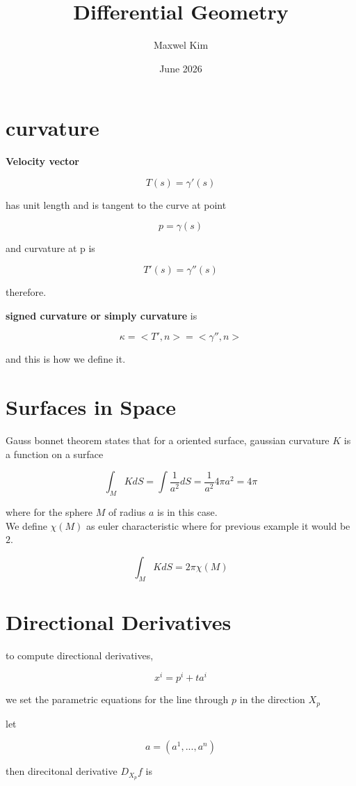 \documentclass{article}
\title{Differential Geometry}
\author{Maxwel Kim}
\date{June 2026}
\begin{document}
\maketitle

\section*{curvature}

\textbf{Velocity vector} 

\[
T(s)=\gamma'(s)
\]

has unit length and is tangent to the curve at point

\[
p=\gamma(s)
\]

and curvature at p is

\[
T'(s)=\gamma''(s)
\]

therefore.

\textbf{signed curvature or simply curvature} is 

\[
\kappa =<T',n>=<\gamma'',n>
\]

and this is how we define it.

\section*{Surfaces in Space}

Gauss bonnet theorem states that for a oriented surface, gaussian curvature $K$ is a function on a surface

\[
\int_M KdS=\int \frac{1}{a^2}dS=\frac{1}{a^2}4\pi a^2=4\pi
\]

where for the sphere $M$ of radius $a$ is in this case. \\

We define $\chi(M)$ as euler characteristic where for previous example it would be $2$.

\[
\int _M KdS=2\pi \chi(M)
\]

\section*{Directional Derivatives}

to compute directional derivatives, 

\[
x^i=p^i+ta^i
\]

we set the parametric equations for the line through $p$ in the direction $X_p$

let 

\[
a=(a^1,...,a^n)
\]

then direcitonal derivative $D_{X_p}f$ is 
\end{document}
